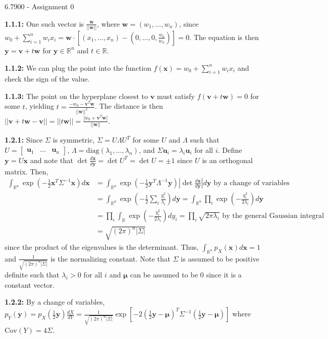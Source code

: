 \documentclass[12pt]{article}
\newcommand{\C}{\text{Cov}}
\newcommand{\m}[1]{\mathbf{#1}}
\newcommand{\R}{\mathbb{R}}
\begin{document}
\begin{center}
{\Large 6.7900 - Assignment 0}
\end{center}

\textbf{1.1.1:} One such vector is $\frac{\m w}{||\m w||}$, where $\m w=(w_1,\dots,w_n)$, since $w_0+\sum_{i=1}^nw_ix_i=\m w\cdot[(x_1,\dots,x_n)-(0,\dots,0,\frac{w_0}{w_n})]=0$. The equation is then $\m y=\m v+t\m w$ for $\m y\in\R^n$ and $t\in\R$.

\textbf{1.1.2:} We can plug the point into the function $f(\m x)=w_0+\sum_{i=1}^nw_ix_i$ and check the sign of the value.

\textbf{1.1.3:} The point on the hyperplane closest to $\m v$ must satisfy $f(\m v+t\m w)=0$ for some $t$, yielding $t=\frac{-w_0-\m v^T\m w}{||\m w||^2}$. The distance is then $||\m v+t\m w-\m v||=||t\m w||=\frac{|w_0+\m v^T\m w|}{||\m w||}$.

\textbf{1.2.1:} Since $\Sigma$ is symmetric, $\Sigma=U\Lambda U^T$ for some $U$ and $\Lambda$ such that $U=\begin{bmatrix}\m u_1 & \dots & \m u_n\end{bmatrix}$, $\Lambda=\text{diag}(\lambda_1,\dots,\lambda_n)$, and $\Sigma\m u_i=\lambda_i\m u_i$ for all $i$. Define $\m y=U\m x$ and note that $\det\frac{d\m x}{d\m y}=\det U^T=\det U=\pm 1$ since $U$ is an orthogonal matrix. Then,\begin{align*}
    \int_{\R^n}\exp(-\frac{1}{2}\m x^T\Sigma^{-1}\m x)d\m x &=\int_{\R^n}\exp(-\frac{1}{2}\m y^T\Lambda^{-1}\m y)|\det\frac{d\m x}{d\m y}|d\m y\text{ by a change of variables}\\
    &=\int_{\R^n}\exp(-\frac{1}{2}\sum_i\frac{y_i^2}{\lambda_i})d\m y=\int_{\R^n}\prod_i\exp(-\frac{y_i^2}{2\lambda_i})d\m y\\
    &=\prod_i\int_{\R}\exp(-\frac{y_i^2}{2\lambda_i})dy_i=\prod_i\sqrt{2\pi\lambda_i}\text{ by the general Gaussian integral}\\
    &=\sqrt{(2\pi)^n|\Sigma|}
\end{align*}since the product of the eigenvalues is the determinant. Thus, $\int_{\R^n}p_X(\m x)d\m x=1$ and $\frac{1}{\sqrt{(2\pi)^n|\Sigma|}}$ is the normalizing constant. Note that $\Sigma$ is assumed to be positive definite such that $\lambda_i>0$ for all $i$ and $\bm\mu$ can be assumed to be 0 since it is a constant vector.

\textbf{1.2.2:} By a change of variables, $p_Y(\m y)=p_X(\frac{1}{2}\m y)\frac{dX}{dY}=\frac{1}{\sqrt{(2\pi)^n|\Sigma|}}\exp[-2(\frac{1}{2}\m y-\bm{\mu})^T\Sigma^{-1}(\frac{1}{2}\m y-\bm\mu)]$ where $\C(Y)=4\Sigma$.
\end{document}
